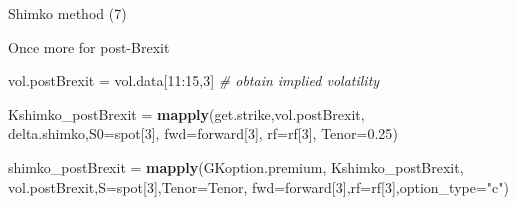 \documentclass[ignorenonframetext,aspectratio=169]{beamer}
\newenvironment{Shaded}{}{}
\newcommand{\KeywordTok}[1]{\textcolor[rgb]{0.00,0.44,0.13}{\textbf{#1}}}
\newcommand{\DataTypeTok}[1]{\textcolor[rgb]{0.56,0.13,0.00}{#1}}
\newcommand{\DecValTok}[1]{\textcolor[rgb]{0.25,0.63,0.44}{#1}}
\newcommand{\FloatTok}[1]{\textcolor[rgb]{0.25,0.63,0.44}{#1}}
\newcommand{\StringTok}[1]{\textcolor[rgb]{0.25,0.44,0.63}{#1}}
\newcommand{\CommentTok}[1]{\textcolor[rgb]{0.38,0.63,0.69}{\textit{#1}}}
\newcommand{\OperatorTok}[1]{\textcolor[rgb]{0.40,0.40,0.40}{#1}}
\newcommand{\NormalTok}[1]{#1}
\begin{document}
\begin{frame}[fragile]{Shimko method (7)}

Once more for post-Brexit

\begin{Shaded}
\begin{Highlighting}[]
\NormalTok{vol.postBrexit =}\StringTok{ }\NormalTok{vol.data[}\DecValTok{11}\OperatorTok{:}\DecValTok{15}\NormalTok{,}\DecValTok{3}\NormalTok{]         }\CommentTok{# obtain implied volatility}

\NormalTok{Kshimko_postBrexit =}\StringTok{ }\KeywordTok{mapply}\NormalTok{(get.strike,vol.postBrexit, }
\NormalTok{                        delta.shimko,}\DataTypeTok{S0=}\NormalTok{spot[}\DecValTok{3}\NormalTok{], }
                        \DataTypeTok{fwd=}\NormalTok{forward[}\DecValTok{3}\NormalTok{], }\DataTypeTok{rf=}\NormalTok{rf[}\DecValTok{3}\NormalTok{], }\DataTypeTok{Tenor=}\FloatTok{0.25}\NormalTok{)}

\NormalTok{shimko_postBrexit =}\StringTok{ }\KeywordTok{mapply}\NormalTok{(GKoption.premium, Kshimko_postBrexit, }
\NormalTok{                       vol.postBrexit,}\DataTypeTok{S=}\NormalTok{spot[}\DecValTok{3}\NormalTok{],}\DataTypeTok{Tenor=}\NormalTok{Tenor,}
                       \DataTypeTok{fwd=}\NormalTok{forward[}\DecValTok{3}\NormalTok{],}\DataTypeTok{rf=}\NormalTok{rf[}\DecValTok{3}\NormalTok{],}\DataTypeTok{option_type=}\StringTok{"c"}\NormalTok{)}
\end{Highlighting}
\end{Shaded}

\end{frame}
\end{document}
